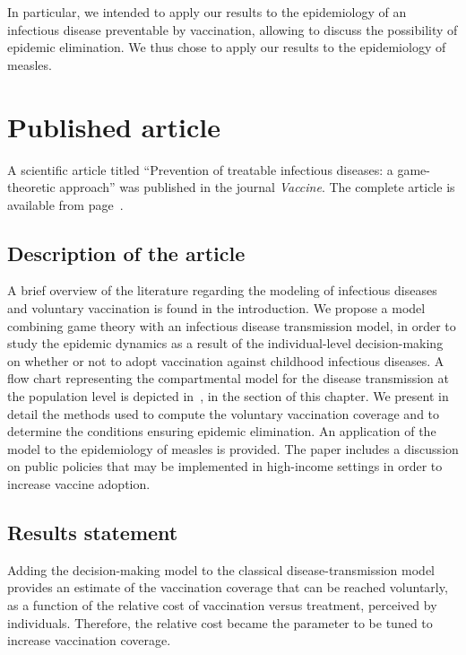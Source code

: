 In particular, we intended to apply our results to the epidemiology of an infectious disease preventable by vaccination, allowing to discuss the possibility of epidemic elimination. We thus chose to apply our results to the epidemiology of measles.



\section{Published article}
\label{Vaccine:Article}

A scientific article titled ``Prevention of treatable infectious diseases: a game-theoretic approach'' \cite[]{Jijon2017} was published in the journal \textit{Vaccine}. The complete article is available from page~\pageref{articlepdf:1}.

\subsection{Description of the article}
A brief overview of the literature regarding the modeling of infectious diseases and voluntary vaccination is found in the introduction. We propose a model combining game theory with an infectious disease transmission model, in order to study the epidemic dynamics as a result of the individual-level decision-making on whether or not to adopt vaccination against childhood infectious diseases. A flow chart representing the compartmental model for the disease transmission at the population level is depicted in~, in the  section of this chapter. 
%  
We present in detail the methods used to compute the voluntary vaccination coverage and to determine the conditions ensuring epidemic elimination. 
An application of the model to the epidemiology of measles is provided. The paper includes a discussion on public policies that may be implemented in high-income settings in order to increase vaccine adoption.

\subsection{Results statement}
\label{Vaccine:Results}

Adding the decision-making model to the classical disease-transmission model provides an estimate of the vaccination coverage that can be reached voluntarly, as a function of the relative cost of vaccination versus treatment, perceived by individuals. Therefore, the relative cost became the parameter to be tuned to increase vaccination coverage.

